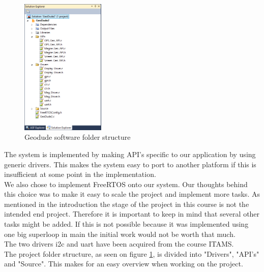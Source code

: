 \begin{figure}
\vspace{-30pt}
\begin{center}
\includegraphics[width=4cm]{billeder/folder_structure}
\end{center}
\vspace{-20pt}
\caption{Geodude software folder structure}
\vspace{-20pt}
\label{fig:fold_structure}
\end{figure}
The system is implemented by making API's specific to our application by using generic drivers. This makes the system easy to port to another platform if this is insufficient at some point in the implementation.\\
We also chose to implement FreeRTOS onto our system. Our thoughts behind this choice was to make it easy to scale the project and implement more tasks. As mentioned in the introduction the stage of the project in this course is not the intended end project. Therefore it is important to keep in mind that several other tasks might be added. If this is not possible because it was implemented using one big superloop in main the initial work would not be worth that much.\\%
The two drivers i2c and uart have been acquired from the course ITAMS.\\
The project folder structure, as seen on figure \ref{fig:fold_structure}, is divided into "Drivers", "API's" and "Source". This makes for an easy overview when working on the project.\\

